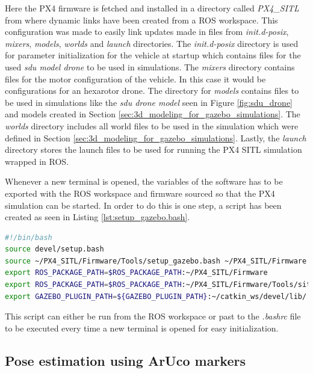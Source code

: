 \documentclass[../Head/report.tex]{subfiles}
\begin{document}
Here the PX4 firmware is fetched and installed in a directory called \textit{PX4\_SITL} from where dynamic links have been created from a ROS workspace. This configuration was made to easily link updates made in files from \textit{init.d-posix}, \textit{mixers}, \textit{models}, \textit{worlds} and \textit{launch} directories. The \textit{init.d-posix} directory is used for parameter initialization for the vehicle at startup which contains files for the used \textit{sdu model drone} to be used in simulations. The \textit{mixers} directory contains files for the motor configuration of the vehicle. In this case it would be configurations for an hexarotor drone. The directory for \textit{models} contains files to be used in simulations like the \textit{sdu drone model} seen in Figure  \ref{fig:sdu_drone} and models created in Section \ref{sec:3d_modeling_for_gazebo_simulations}. The \textit{worlds} directory includes all world files to be used in the simulation which were defined in Section \ref{sec:3d_modeling_for_gazebo_simulations}. Lastly, the \textit{launch} directory stores the launch files to be used for running the PX4 SITL simulation wrapped in ROS.   

Whenever a new terminal is opened, the variables of the software has to be exported with the ROS workspace and firmware sourced so that the PX4 simulation can be started. In order to do this is one step, a script has been created as seen in Listing \ref{lst:setup_gazebo.bash}. 

\begin{lstlisting}[language=bash, frame=none, caption={Setup gazebo and PX4 from ROS workspace},label=lst:setup_gazebo.bash]
#!/bin/bash
source devel/setup.bash
source ~/PX4_SITL/Firmware/Tools/setup_gazebo.bash ~/PX4_SITL/Firmware ~/PX4_SITL/Firmware/build/px4_sitl_default
export ROS_PACKAGE_PATH=$ROS_PACKAGE_PATH:~/PX4_SITL/Firmware
export ROS_PACKAGE_PATH=$ROS_PACKAGE_PATH:~/PX4_SITL/Firmware/Tools/sitl_gazebo
export GAZEBO_PLUGIN_PATH=${GAZEBO_PLUGIN_PATH}:~/catkin_ws/devel/lib/
\end{lstlisting} 

This script can either be run from the ROS workspace or past to the \textit{.bashrc} file to be executed every time a new terminal is opened for easy initialization. 


\subsection{Pose estimation using ArUco markers}
\label{sec:pose_estimation_using_aruco_markers}
\end{document}
